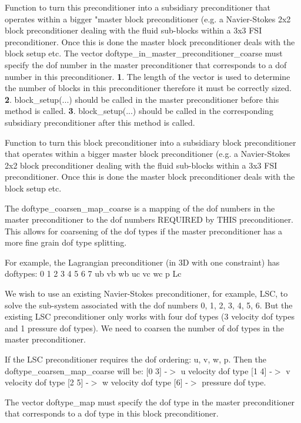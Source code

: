 Function to turn this preconditioner into a subsidiary preconditioner that operates within a bigger "master block preconditioner (e.\+g. a Navier-\/\+Stokes 2x2 block preconditioner dealing with the fluid sub-\/blocks within a 3x3 F\+SI preconditioner. Once this is done the master block preconditioner deals with the block setup etc. The vector doftype\+\_\+in\+\_\+master\+\_\+preconditioner\+\_\+coarse must specify the dof number in the master preconditioner that corresponds to a dof number in this preconditioner. {\bfseries 1}. The length of the vector is used to determine the number of blocks in this preconditioner therefore it must be correctly sized. {\bfseries 2}. block\+\_\+setup(...) should be called in the master preconditioner before this method is called. {\bfseries 3}. block\+\_\+setup(...) should be called in the corresponding subsidiary preconditioner after this method is called. 

Function to turn this block preconditioner into a subsidiary block preconditioner that operates within a bigger master block preconditioner (e.\+g. a Navier-\/\+Stokes 2x2 block preconditioner dealing with the fluid sub-\/blocks within a 3x3 F\+SI preconditioner. Once this is done the master block preconditioner deals with the block setup etc.

The doftype\+\_\+coarsen\+\_\+map\+\_\+coarse is a mapping of the dof numbers in the master preconditioner to the dof numbers R\+E\+Q\+U\+I\+R\+ED by T\+H\+IS preconditioner. This allows for coarsening of the dof types if the master preconditioner has a more fine grain dof type splitting.

For example, the Lagrangian preconditioner (in 3D with one constraint) has doftypes\+: 0 1 2 3 4 5 6 7 ub vb wb uc vc wc p Lc

We wish to use an existing Navier-\/\+Stokes preconditioner, for example, L\+SC, to solve the sub-\/system associated with the dof numbers 0, 1, 2, 3, 4, 5, 6. But the existing L\+SC preconditioner only works with four dof types (3 velocity dof types and 1 pressure dof types). We need to coarsen the number of dof types in the master preconditioner.

If the L\+SC preconditioner requires the dof ordering\+: u, v, w, p. Then the doftype\+\_\+coarsen\+\_\+map\+\_\+coarse will be\+: \mbox{[}0 3\mbox{]} -\/$>$ u velocity dof type \mbox{[}1 4\mbox{]} -\/$>$ v velocity dof type \mbox{[}2 5\mbox{]} -\/$>$ w velocity dof type \mbox{[}6\mbox{]} -\/$>$ pressure dof type.

The vector doftype\+\_\+map must specify the dof type in the master preconditioner that corresponds to a dof type in this block preconditioner.

